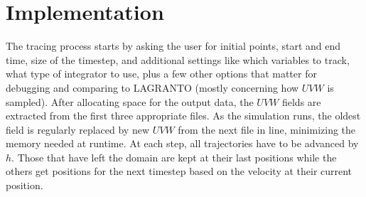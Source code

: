 \section{Implementation}
The tracing process starts by asking the user for initial points, start and end time, size of the timestep, and additional settings like which variables to track, what type of integrator to use, plus a few other options that matter for debugging and comparing to LAGRANTO (mostly concerning how $UVW$ is sampled). After allocating space for the output data, the $UVW$ fields are extracted from the first three appropriate files. As the simulation runs, the oldest field is regularly replaced by new $UVW$ from the next file in line, minimizing the memory needed at runtime.
At each step, all trajectories have to be advanced by $h$. Those that have left the domain are kept at their last positions while the others get positions for the next timestep based on the velocity at their current position.

